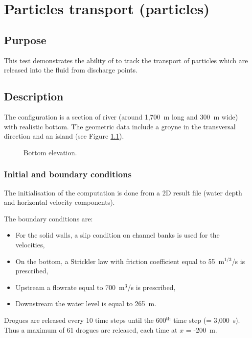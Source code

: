 \chapter{Particles transport (particles)}

\section{Purpose}

This test demonstrates the ability of  to track the
transport of particles which are released into the fluid from discharge
points.

\section{Description}

The configuration is a section of river (around 1,700~m long and 300~m wide)
with realistic bottom.
The geometric data include a groyne in the transversal direction and an island
(see Figure \ref{t3d:particles:fig:Bottom}).

\begin{figure}[!htbp]
 \centering
 \caption{Bottom elevation.}
 \label{t3d:particles:fig:Bottom}
\end{figure}

\subsection{Initial and boundary conditions}

The initialisation of the computation is done from a 2D result file (water depth
and horizontal velocity components).

The boundary conditions are:
\begin{itemize}
\item For the solid walls, a slip condition on channel banks is used for the
velocities,
\item On the bottom, a Strickler law with friction coefficient equal to
55~m$^{1/3}$/s is prescribed,
\item Upstream a flowrate equal to 700~m$^3$/s is prescribed,
\item Downstream the water level is equal to 265~m.
\end{itemize}

Drogues are released every 10 time steps until the 600$^{\textrm{th}}$ time step
(= 3,000~s).
Thus a maximum of 61 drogues are released, each time at $x$ = -200~m.

